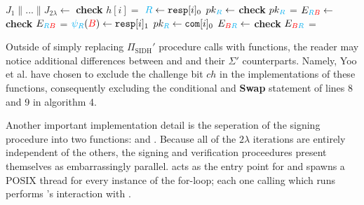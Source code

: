 \begin{algorithm}[H]
\caption{-- }\label{euclid}
\begin{algorithmic}[1]
\State $J_{1} \parallel ... \parallel J_{2\lambda} \gets$ 
	\State \textbf{check} $h[i] =$ 
		\State $\textcolor{cyan}{R} \gets \texttt{resp}[i]_{0}$
		\State $pk_{\textcolor{cyan}{R}} \gets$ 
		\State \textbf{check} $pk_{\textcolor{cyan}{R}}$ = 
		\State $E_{\textcolor{cyan}{R}\textcolor{red}{B}} \gets$ 
		\State \textbf{check} $E_{\textcolor{cyan}{R}\textcolor{red}{B}}$ = 
	\Else
		\State $\textcolor{cyan}{\psi_R}(\textcolor{red}{B}) \gets \texttt{resp}[i]_{1}$
		\State $pk_{\textcolor{cyan}{R}} \gets \texttt{com}[i]_{0}$
		\State $E_{\textcolor{red}{B}\textcolor{cyan}{R}} \gets$ 
		\State \textbf{check} $E_{\textcolor{red}{B}\textcolor{cyan}{R}}$ = 
	\EndIf
\EndFor

	\State {}
\Else
	\State {}
\EndIf
\end{algorithmic}
\end{algorithm}

Outside of simply replacing $\Pi_{\text{SIDH}}'$ procedure calls with \sidh functions, the reader may notice additional differences between  and  and their $\Sigma'$ counterparts. Namely, Yoo et al. have chosen to exclude the challenge bit $ch$ in the \sidh implementations of these functions, consequently excluding the conditional and \textbf{Swap} statement of lines 8 and 9 in algorithm 4. 

Another important implementation detail is the seperation of the signing procedure into two functions:  and . Because all of the $2\lambda$ iterations are entirely independent of the others, the signing and verification proceedures present themselves as embarrassingly parallel.  acts as the entry point for  and spawns a POSIX thread for every instance of the for-loop; each one calling  which runs performs \bob's interaction with \randall.


